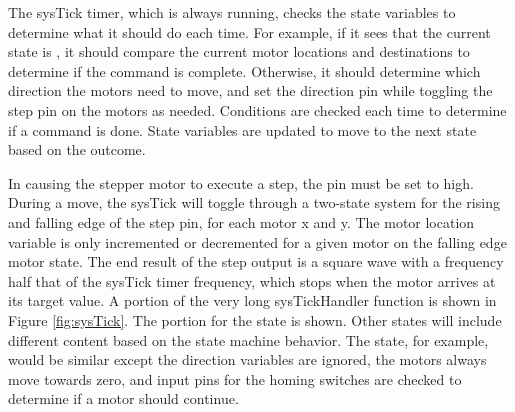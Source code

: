 \documentclass[11pt]{LaTeX-Classes/math-hw}
\begin{document}
The sysTick timer, which is always running, checks the state variables to determine what it should
do each time. For example, if it sees that the current state is , it should compare the current
motor locations and destinations to determine if the command is complete. Otherwise, it should
determine which direction the motors need to move, and set the direction pin while toggling
the step pin on the motors as needed.
Conditions are checked each time to determine if a command is done.
State variables are updated to move to the next state based on the outcome.

In causing the stepper motor to execute a step, the  pin must be set to high.
During a move, the sysTick will toggle through a two-state system for the rising and falling
edge of the step pin, for each motor x and y. The motor location variable
is only incremented or decremented
for a given motor on the falling edge motor state.
The end result of the step output is a square wave with a frequency half that
of the sysTick timer frequency, which stops when the motor arrives at its target value.
A portion of the very long sysTickHandler function is shown in Figure \ref{fig:sysTick}.
The portion for the  state is shown. Other states will include different content
based on the state machine behavior. The  state, for example, would be similar
except the direction variables are ignored, the motors always move towards zero, and input
pins for the homing switches are checked to determine if a motor should continue.
\end{document}
